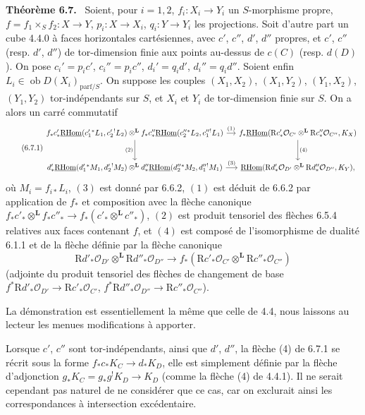 \documentclass[11pt]{article}
\providecommand{\cO}{\mathcal{O}}
\newenvironment{statement}[1]{\par\medskip\noindent\textbf{#1.}\ }{\par\medskip}
\newcommand{\R}{\mathrm{R}}\newcommand{\RHomCore}{\mathrm{RHom}}
\providecommand{\RHom}{\RHomCore}
\providecommand{\uRHom}{\underline{\RHom}}
\providecommand{\RHom}{\RHomCore}
\providecommand{\RHom}{\R\mathcal{H}om}
\providecommand{\R}{\mathrm R}
\providecommand{\RHom}{\RHomCore}
\begin{document}
\begin{statement}{Théorème 6.7}
Soient, pour $i=1,2$, $f_i:X_i\to Y_i$ un $S$-morphisme propre, $f=f_1\times_Sf_2:X\to Y$, $p_i:X\to X_i$, $q_i:Y\to Y_i$ les projections. Soit d'autre part un cube 4.4.0 à faces horizontales cartésiennes, avec $c'$, $c''$, $d'$, $d''$ propres, et $c'$, $c''$ (resp. $d'$, $d''$) de tor-dimension finie aux points au-dessus de $c(C)$ (resp. $d(D)$). On pose $c_i'=p_ic'$, $c_i''=p_ic''$, $d_i'=q_id'$, $d_i''=q_id''$. Soient enfin $L_i\in\operatorname{ob}D(X_i)_{\mathrm{parf}/S}$. On suppose les couples $(X_1,X_2)$, $(X_1,Y_2)$, $(Y_1,X_2)$, $(Y_1,Y_2)$ tor-indépendants sur $S$, et $X_i$ et $Y_i$ de tor-dimension finie sur $S$. On a alors un carré commutatif
\begin{equation}
\tag{6.7.1}
\begin{tikzcd}[column sep=small,row sep=large]
f_*c'_*\uRHom(c_1'{}^*L_1,c_2'{}^!L_2)\otimes^{\mathbf L} f_*c''_*\uRHom(c_2''{}^*L_2,c_1''{}^!L_1) \arrow[r,"(1)"] \arrow[d,"(2)"']
& f_*\uRHom(\R c'_*\cO_{C'}\otimes^{\mathbf L}\R c''_*\cO_{C''},K_X) \arrow[d,"(4)"] \\
d'_*\uRHom(d_1'{}^*M_1,d_2'{}^!M_2)\otimes^{\mathbf L} d''_*\uRHom(d_2''{}^*M_2,d_1''{}^!M_1) \arrow[r,"(3)"]
& \uRHom(\R d'_*\cO_{D'}\otimes^{\mathbf L}\R d''_*\cO_{D''},K_Y),
\end{tikzcd}
\end{equation}
où $M_i=f_{i*}L_i$, $(3)$ est donné par 6.6.2, $(1)$ est déduit de 6.6.2 par application de $f_*$ et composition avec la flèche canonique $f_*c'_*\otimes^{\mathbf L} f_*c''_*\to f_*(c'_*\otimes^{\mathbf L} c''_*)$, $(2)$ est produit tensoriel des flèches 6.5.4 relatives aux faces contenant $f$, et $(4)$ est composé de l'isomorphisme de dualité 6.1.1 et de la flèche définie par la flèche canonique
\[
\R d'_*\cO_{D'}\otimes^{\mathbf L}\R d''_*\cO_{D''}\longrightarrow f_*(\R c'_*\cO_{C'}\otimes^{\mathbf L}\R c''_*\cO_{C''})
\]
(adjointe du produit tensoriel des flèches de changement de base $f^*\R d'_*\cO_{D'}\to \R c'_*\cO_{C'}$, $f^*\R d''_*\cO_{D''}\to \R c''_*\cO_{C''}$).
\end{statement}

La démonstration est essentiellement la même que celle de 4.4, nous laissons au lecteur les menues modifications à apporter.

Lorsque $c'$, $c''$ sont tor-indépendants, ainsi que $d'$, $d''$, la flèche (4) de 6.7.1 se récrit sous la forme $f_*c_*K_C\to d_*K_D$, elle est simplement définie par la flèche d'adjonction $g_*K_C=g_*g^!K_D\to K_D$ (comme la flèche (4) de 4.4.1). Il ne serait cependant pas naturel de ne considérer que ce cas, car on exclurait ainsi les correspondances à intersection excédentaire.
\end{document}
